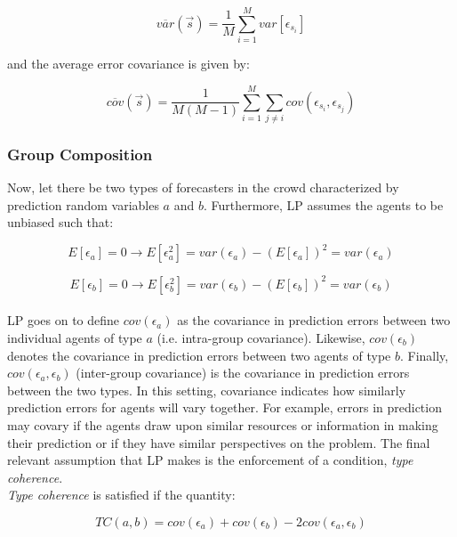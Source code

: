 \documentclass[twoside,twocolumn]{article}
\begin{document}
\begin{equation}
\label{var}
\overline{var}(\vec{s}) = \frac1M \sum_{i = 1}^M var[\epsilon_{s_i}]
\end{equation}

and the average error covariance is given by:

\begin{equation}
\label{cov}
\overline{cov}(\vec{s}) = \frac{1}{M(M-1)} \sum_{i = 1}^M \sum_{j \neq i}cov(\epsilon_{s_i}, \epsilon_{s_j})
\end{equation}

\subsubsection{Group Composition}

Now, let there be two types of forecasters in the crowd characterized by prediction random variables $a$ and $b$. Furthermore, LP assumes the agents to be unbiased such that:

\begin{equation}
\label{unbiaseda}
E[\epsilon_a] = 0 \rightarrow E[\epsilon_a^2] = var(\epsilon_a) - (E[\epsilon_a])^2 = var(\epsilon_a)
\end{equation}

\begin{equation}
\label{unbiasedb}
E[\epsilon_b] = 0 \rightarrow E[\epsilon_b^2] = var(\epsilon_b) - (E[\epsilon_b])^2 = var(\epsilon_b)
\end{equation}\\

LP goes on to define $cov(\epsilon_a)$ as the covariance in prediction errors between two individual agents of type $a$ (i.e. intra-group covariance). Likewise, $cov(\epsilon_b)$ denotes the covariance in prediction errors between two agents of type $b$. Finally, $cov(\epsilon_a, \epsilon_b)$ (inter-group covariance) is the covariance in prediction errors between the two types. In this setting, covariance indicates how similarly prediction errors for agents will vary together. For example, errors in prediction may covary if the agents draw upon similar resources or information in making their prediction or if they have similar perspectives on the problem. The final relevant assumption that LP makes is the enforcement of a condition, \textit{type coherence}.\\

\textit{Type coherence} is satisfied if the quantity:

\begin{equation}
\label{typeco}
TC(a,b) = cov(\epsilon_a) + cov(\epsilon_b) - 2cov(\epsilon_a, \epsilon_b)
\end{equation}\\
\end{document}
